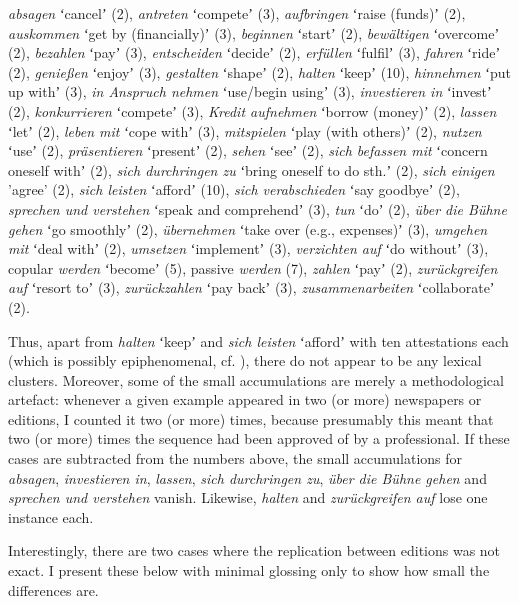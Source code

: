 \documentclass[output=paper,hidelinks]{langscibook}
\begin{document}
\begin{enumerate}[label=(\roman*)]
\begin{sloppypar}
\emph{absagen}  ʻcancelʼ (2), \emph{antreten}  ʻcompeteʼ (3), \emph{aufbringen}  ʻraise (funds)ʼ (2), \emph{auskommen}  ʻget by (financially)ʼ (3), \emph{beginnen}  ʻstartʼ (2), \emph{bewältigen}  ʻovercomeʼ (2), \emph{bezahlen}  ʻpayʼ (3), \emph{entscheiden}  ʻdecideʼ (2), \emph{erfüllen}  ʻfulfilʼ (3), \emph{fahren}  ʻrideʼ (2), \emph{genießen}  ʻenjoyʼ (3), \emph{gestalten}  ʻshapeʼ (2), \emph{halten}  ʻkeepʼ (10), \emph{hinnehmen}  ʻput up withʼ (3), \emph{in Anspruch nehmen} ʻuse/begin usingʼ (3), \emph{investieren in}  ʻinvestʼ (2), \emph{konkurrieren}  ʻcompeteʼ (3), \emph{Kredit aufnehmen} ʻborrow (money)ʼ (2), \emph{lassen}  ʻletʼ (2), \emph{leben mit}  ʻcope withʼ (3), \emph{mitspielen}  ʻplay (with others)ʼ (2), \emph{nutzen}  ʻuseʼ (2), \emph{präsentieren}  ʻpresentʼ (2), \emph{sehen}  ʻseeʼ (2), \emph{sich befassen mit}  ʻconcern oneself withʼ (2), \emph{sich durchringen zu}  ʻbring oneself to do sth.ʼ (2), \emph{sich einigen} 'agree' (2), \emph{sich leisten}  ʻaffordʼ (10), \emph{sich verabschieden}  ʻsay goodbyeʼ (2), \emph{sprechen und verstehen}  ʻspeak and comprehendʼ (3), \emph{tun}  ʻdoʼ (2), \emph{über die Bühne gehen}  ʻgo smoothlyʼ (2), \emph{übernehmen}  ʻtake over (e.g., expenses)ʼ (3), \emph{umgehen mit}  ʻdeal withʼ (2), \emph{umsetzen}  ʻimplementʼ (3), \emph{verzichten auf}  ʻdo withoutʼ (3), copular \emph{werden}  ʻbecomeʼ (5), passive \emph{werden} (7), \emph{zahlen}  ʻpayʼ (2), \emph{zurückgreifen auf}  ʻresort toʼ (3), \emph{zurückzahlen}  ʻpay backʼ (3), \emph{zusammenarbeiten}  ʻcollaborateʼ (2).
\end{sloppypar}

Thus, apart from \emph{halten}  ʻkeepʼ and \emph{sich leisten}  ʻaffordʼ with ten attestations each (which is possibly epiphenomenal, cf. \citealt{Reiner2018}), there do not appear to be any lexical clusters. Moreover, some of the small accumulations are merely a methodological artefact: whenever a given example appeared in two (or more) newspapers or editions, I counted it two (or more) times, because presumably this meant that two (or more) times the sequence had been approved of by a professional. If these cases are subtracted from the numbers above, the small accumulations for \emph{absagen}, \emph{investieren in}, \emph{lassen}, \emph{sich durchringen zu}, \emph{über die Bühne gehen} and \emph{sprechen und verstehen} vanish. Likewise, \emph{halten} and \emph{zurückgreifen auf} lose one instance each.

Interestingly, there are two cases where the replication between editions was not exact. I present these below with minimal glossing only to show how small the differences are.


\end{enumerate}
\end{document}

